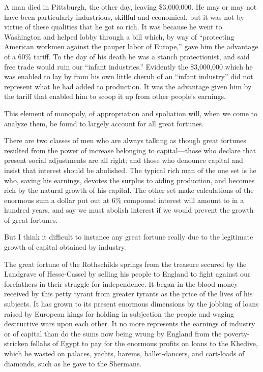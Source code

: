 \documentclass{book}
\begin{document}
A man died in Pittsburgh, the other day, leaving \$3,000,000. He may or may not have been particularly industrious, skillful and economical, but it was not by virtue of these qualities that he got so rich. It was because he went to Washington and helped lobby through a bill which, by way of “protecting American workmen against the pauper labor of Europe,” gave him the advantage of a 60\% tariff. To the day of his death he was a stanch protectionist, and said free trade would ruin our “infant industries.” Evidently the \$3,000,000 which he was enabled to lay by from his own little cherub of an “infant industry” did not represent what he had added to production. It was the advantage given him by the tariff that enabled him to scoop it up from other people’s earnings.

This element of monopoly, of appropriation and spoliation will, when we come to analyze them, be found to largely account for all great fortunes.

There are two classes of men who are always talking as though great fortunes resulted from the power of increase belonging to capital—those who declare that present social adjustments are all right; and those who denounce capital and insist that interest should be abolished. The typical rich man of the one set is he who, saving his earnings, devotes the surplus to aiding production, and becomes rich by the natural growth of his capital. The other set make calculations of the enormous sum a dollar put out at 6\% compound interest will amount to in a hundred years, and say we must abolish interest if we would prevent the growth of great fortunes.

But I think it difficult to instance any great fortune really due to the legitimate growth of capital obtained by industry.

The great fortune of the Rothschilds springs from the treasure secured by the Landgrave of Hesse-Cassel by selling his people to England to fight against our forefathers in their struggle for independence. It began in the blood-money received by this petty tyrant from greater tyrants as the price of the lives of his subjects. It has grown to its present enormous dimensions by the jobbing of loans raised by European kings for holding in subjection the people and waging destructive wars upon each other. It no more represents the earnings of industry or of capital than do the sums now being wrung by England from the poverty-stricken fellahs of Egypt to pay for the enormous profits on loans to the Khedive, which he wasted on palaces, yachts, harems, ballet-dancers, and cart-loads of diamonds, such as he gave to the Shermans.
\end{document}
